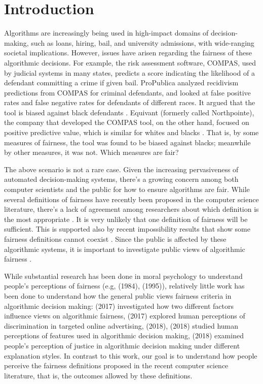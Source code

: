 \documentclass[letterpaper]{article} %
\begin{document}
\section{Introduction}
\noindent Algorithms are increasingly being used in high-impact domains of decision-making, such as loans, hiring, bail, and university admissions, with wide-ranging societal implications. However, issues have arisen regarding the fairness of these algorithmic decisions. For example, the risk assessment software, COMPAS, used by judicial systems in many states, predicts a score indicating the likelihood of a defendant committing a crime if given bail. ProPublica analyzed recidivism predictions from COMPAS for criminal defendants, and looked at false positive rates and false negative rates for defendants of different races. It argued that the tool is biased against black defendants \cite{angwin2016machine}. Equivant (formerly called Northpointe), the company that developed the COMPAS tool, on the other hand, focused on positive predictive value, which is similar for whites and blacks \cite{dieterich2016compas}. That is, by some measures of fairness, the tool was found to be biased against blacks; meanwhile by other measures, it was not. Which measures are fair?

The above scenario is not a rare case. Given the increasing pervasiveness of automated decision-making systems, there's a growing concern among both computer scientists and the public for how to ensure algorithms are fair. While several definitions of fairness have recently been proposed in the computer science literature, there's a lack of agreement among researchers about which definition is the most appropriate \cite{gajane2017formalizing}. It is very unlikely that one definition of fairness will be sufficient. This is supported also by recent impossibility results that show some fairness definitions cannot coexist \cite{kleinberg2016inherent}. Since the public is affected by these algorithmic systems, it is important to investigate public views of algorithmic fairness  \cite{lee2017algorithmic,lee2017human,lee2018understanding,binns2018s,woodruff2018qualitative}. 


While substantial research has been done in moral psychology to understand people's perceptions of fairness (e.g, \citeauthor{yaari1984dividing} (1984), \cite{bazerman1995perceptions} (1995)), relatively little work has been done to understand how the general public views fairness criteria in algorithmic decision making: \citeauthor{pierson2017gender} (2017) investigated how two different factors influence views on algorithmic fairness, \citeauthor{plane2017exploring}  (2017) explored human perceptions of discrimination in targeted online advertising, \citeauthor{grgic2018beyond} (2018), \citeauthor{grgic2018human} (2018) studied human perceptions of features used in algorithmic decision making, \citeauthor{binns2018s} (2018) examined people's perception of justice  in algorithmic decision making under different explanation styles. In contrast to this work, our goal is to understand how people perceive the fairness definitions proposed in the recent computer science literature, that is, the outcomes allowed by these definitions.
\end{document}
